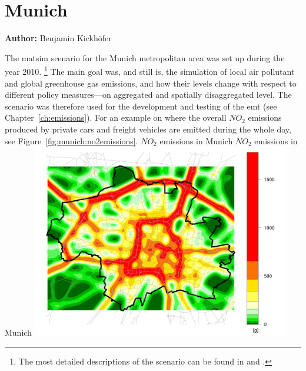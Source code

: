 \section{Munich}
\label{sec:munich}
\hfill \textbf{Author:} Benjamin Kickhöfer

The \gls{matsim} scenario for the Munich metropolitan area was set up during the year 2010.%
%
\footnote{
%
The most detailed descriptions of the scenario can be found in \citet{KickhoeferEtAl_VanoutriveVerhetsel_2013} and \citet{Kickhoefer_PhDThesis_2014}.
%
}
%
The main goal was, and still is, the simulation of local air pollutant and global greenhouse gas emissions, and how their levels change with respect to different policy measures---on aggregated and spatially disaggregated level. The scenario was therefore used for the development and testing of the \gls{emt} (see Chapter~\ref{ch:emissions}). For an example on where the overall $\mathit{NO_2}$ emissions produced by private cars and freight vehicles are emitted during the whole day, see Figure~\ref{fig:munich:no2emissions}.
%
\createfigure%
{$\mathit{NO_2}$ emissions in Munich}%
{$\mathit{NO_2}$ emissions in Munich}%
{\label{fig:munich:no2emissions}}%
{\includegraphics[width=0.85\textwidth, angle=0]{./using/figures/baseCase_1500_NO2_g_108000_0.png}}%
{}

